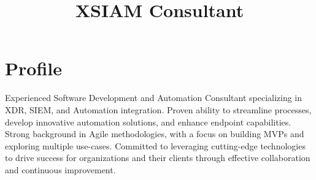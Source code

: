 \documentclass[11pt,a4paper,sans]{moderncv}
\title{XSIAM Consultant}
\begin{document}
\makecvtitle
\vspace*{-10mm}
\section{Profile}



Experienced Software Development and Automation Consultant specializing in XDR, SIEM, and Automation integration. Proven ability to streamline processes, develop innovative automation solutions, and enhance endpoint capabilities. Strong background in Agile methodologies, with a focus on building MVPs and exploring multiple use-cases. Committed to leveraging cutting-edge technologies to drive success for organizations and their clients through effective collaboration and continuous improvement.


\end{document}
